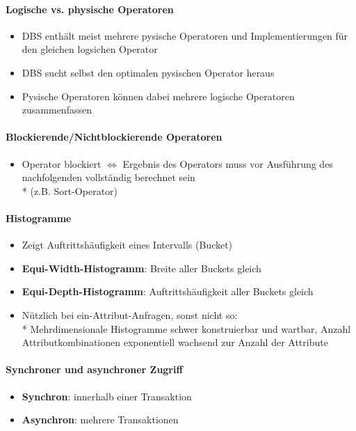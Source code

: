\paragraph{Logische vs. physische Operatoren}
\begin{itemize}
	\item DBS enthält meist mehrere pysische Operatoren und Implementierungen für den gleichen logsichen Operator
	\item DBS sucht selbst den optimalen pysischen Operator heraus
	\item Pysische Operatoren können dabei mehrere logische Operatoren zusammenfassen
\end{itemize}

\paragraph{Blockierende/Nichtblockierende Operatoren}
\begin{itemize}
	\item Operator blockiert \( \Leftrightarrow \) Ergebnis des Operators muss vor Ausführung des nachfolgenden vollständig berechnet sein \\* (z.B. Sort-Operator)
\end{itemize}

\paragraph{Histogramme}
\begin{itemize}
	\item Zeigt Auftrittshäufigkeit eines Intervalls (Bucket)
	\item \textbf{Equi-Width-Histogramm}: Breite aller Buckets gleich
	\item \textbf{Equi-Depth-Histogramm}: Auftrittshäufigkeit aller Buckets gleich
	\item Nützlich bei ein-Attribut-Anfragen, sonst nicht so:
		\\*
		Mehrdimensionale Histogramme schwer konstruierbar und wartbar, Anzahl Attributkombinationen exponentiell wachsend zur Anzahl der Attribute
\end{itemize}

\paragraph{Synchroner und asynchroner Zugriff}
\begin{itemize}
	\item \textbf{Synchron}: innerhalb einer Transaktion
	\item \textbf{Asynchron}: mehrere Transaktionen
\end{itemize}

